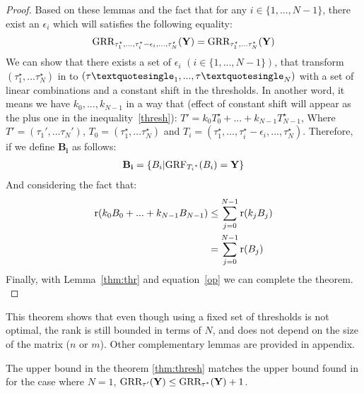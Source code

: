 \documentclass{article}
\begin{document}
\begin{thm:thm}
\begin{proof}
{Based on these lemmas and the fact that for any $i \in \{1,...,N-1\}$, there exist an $\epsilon_i$ which will satisfies the following equality:
\begin{align}
\label{op}
\text{GRR}_{\tau_{1}^{\star},...,\tau_{i}^{\star}-\epsilon_i,...,\tau_{N}^{\star}}(\mathbf{Y}) = \text{GRR}_{\tau_{1}^{\star},...\tau_{N}^{\star}}(\mathbf{Y})
\end{align}
We can show that there exists a set of  $\epsilon_i$ $(i \in \{1,...,N-1\})$, that transform $(\tau_{1}^{\star},...\tau_{N}^{\star})$ in to $(\tau\textquotesingle_{1},...,\tau\textquotesingle_{N})$ with a set of linear combinations and a constant shift in the thresholds. In another word, it means we have $k_0,...,k_{N-1}$ in a way that (effect of constant shift will appear as the plus one in the inequality~\ref{thresh}):
\hspace{5mm}
$
T'=k_0T_0^{\star}+...+k_{N-1}T_{N-1}^{\star}
$, 
Where $T'=(\tau_{1}',...\tau_{N}')$, $T_0=(\tau_{1}^{\star},...\tau_{N}^{\star})$ and $T_i=(\tau_{1}^{\star},...,\tau_{i}^{\star}-\epsilon_i,...,\tau_{N}^{\star})$. Therefore, if we define $\mathbf{B_i}$ as follows:
\begin{align}
\mathbf{B_i}=\{B_i|\text{GRF}_{{T_i}^{\star}}(B_i)=\mathbf{Y}\}
\end{align}
And considering the fact that:
\begin{align}
 \mathrm{r}(k_0B_0+...+k_{N-1}B_{N-1})&\leq \sum_{j=0}^{N-1} \mathrm{r}(k_{j}B_{j})\\
  &=\sum_{j=0}^{N-1} \mathrm{r}(B_{j}) 
\end{align}
Finally, with Lemma~\ref{thm:thr} and equation~\ref{op} we can complete the theorem.
}
\end{proof}
\end{thm:thm}
This theorem shows that even though using a fixed set of thresholds is not optimal, the rank is still bounded in terms of $N$, and does not depend on the size of the matrix ($n$ or $m$). Other complementary lemmas are provided in appendix.
\begin{thm:rmk}
The upper bound in the theorem \ref{thm:thresh} matches the upper bound found in \citet{neumann16:what} for the case where $N=1$,
$
\text{GRR}_{\tau '}(\mathbf{Y}) \leq  \text{GRR}_{\tau^*}(\mathbf{Y})+1
$. %
\end{thm:rmk}



\end{document}
